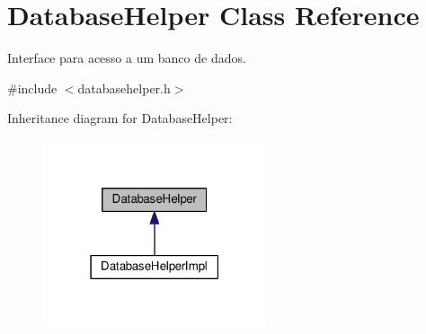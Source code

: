\hypertarget{classDatabaseHelper}{}\section{Database\+Helper Class Reference}
\label{classDatabaseHelper}


Interface para acesso a um banco de dados.  




{\ttfamily \#include $<$databasehelper.\+h$>$}



Inheritance diagram for Database\+Helper\+:
\nopagebreak
\begin{figure}[H]
\begin{center}
\leavevmode
\includegraphics[width=186pt]{d0/dc0/classDatabaseHelper__inherit__graph}
\end{center}
\end{figure}
